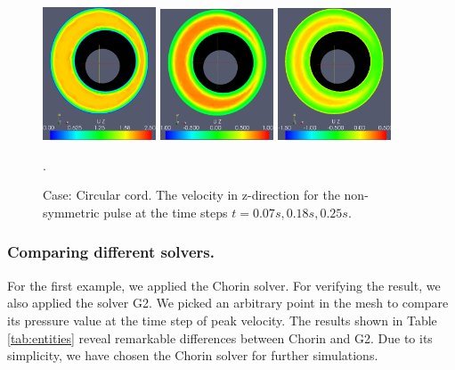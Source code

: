 \begin{figure}\begin{center}
\includegraphics[width=0.3\textwidth]{chapters/hentschel/eps/pulse_f1_08_sysmax_nmb7.eps}
\includegraphics[width=0.3\textwidth]{chapters/hentschel/eps/pulse_f1_08_sysdia_nmb18.eps}
\includegraphics[width=0.3\textwidth]{chapters/hentschel/eps/pulse_f1_08_diamin1_nmb25.eps}
\caption{Case: Circular cord. The velocity in z-direction for the non-symmetric pulse at the time steps $t=0.07s, 0.18s, 0.25s$.}
\label{fig:case1}. 
\end{center}\end{figure}


\subsubsection{Comparing different solvers.}
For the first example, we applied the Chorin solver. For verifying the result, we also
applied the solver G2. We picked an arbitrary point in the
mesh to compare its pressure value at the time step of peak
velocity. The results shown in Table \ref{tab:entities} reveal
remarkable differences between Chorin and G2. Due to its simplicity, 
we have chosen the Chorin solver for further
simulations.

